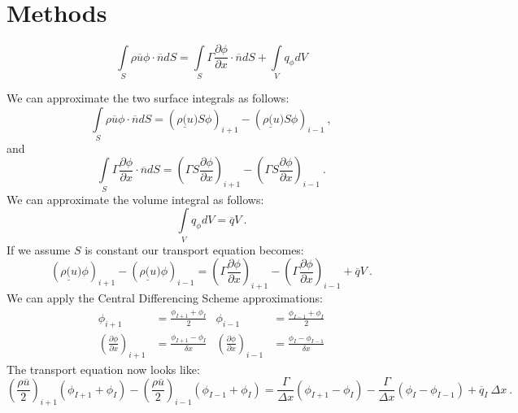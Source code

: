 \documentclass[12pt]{article}
\begin{document}
\section{Methods}

\begin{equation}
    \int\limits_S \rho \overline{u} \phi \cdot \overline{n} dS = \int\limits_S \Gamma \frac{\partial \phi}{\partial x} \cdot \overline{n} dS + \int\limits_V q_{\phi} dV
    \label{eq:transport}
\end{equation}

We can approximate the two surface integrals as follows:
\begin{equation*}
    \int\limits_S \rho \overline{u} \phi \cdot \overline{n} dS = \left( \rho\underline(u) S\phi \right)_{i+1} - \left( \rho\underline(u) S\phi \right)_{i-1}\:,
\end{equation*}
and
\begin{equation*}
    \int\limits_S \Gamma \frac{\partial \phi}{\partial x} \cdot \overline{n} dS = \left( \Gamma S \frac{\partial \phi}{\partial x} \right)_{i+1} - \left( \Gamma S \frac{\partial \phi}{\partial x} \right)_{i-1}\:.
\end{equation*}
We can approximate the volume integral as follows:
\begin{equation*}
    \int\limits_V q_{\phi} dV = \overline{q} V\:.
\end{equation*}
If we assume $S$ is constant our transport equation becomes:
\begin{equation*}
    \left( \rho\underline(u) \phi \right)_{i+1} - \left( \rho\underline(u) \phi \right)_{i-1} = \left( \Gamma \frac{\partial \phi}{\partial x} \right)_{i+1} - \left( \Gamma \frac{\partial \phi}{\partial x} \right)_{i-1} + \overline{q} V\:.
\end{equation*}
We can apply the Central Differencing Scheme approximations:
\begin{align*}
    \phi_{i+1} &= \frac{\phi_{I+1} + \phi_{I}}{2} & \phi_{i-1} &= \frac{\phi_{I-1} + \phi_{I}}{2} \\
    \left(\frac{\partial \phi}{\partial x}\right)_{i+1} &= \frac{\phi_{I+1} - \phi_{I}}{\delta x} & \left(\frac{\partial \phi}{\partial x}\right)_{i-1} &= \frac{\phi_{I} - \phi_{I-1}}{\delta x}
\end{align*}
The transport equation now looks like:
\begin{equation*}
    \left(\frac{\rho \overline{u}}{2}\right)_{i+1} \left( \phi_{I+1} + \phi_{I} \right) - \left(\frac{\rho \overline{u}}{2}\right)_{i-1} \left( \phi_{I-1} + \phi_{I} \right) = \frac{\Gamma}{\Delta x} \left( \phi_{I+1} - \phi_{I} \right) - \frac{\Gamma}{\Delta x} \left( \phi_{I} - \phi_{I-1} \right) + \overline{q}_{I}\: \Delta x\:.
\end{equation*}
\end{document}
